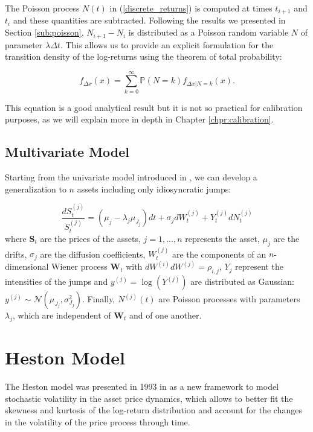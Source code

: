 The Poisson process $N(t)$ in (\ref{discrete_returns}) is computed at times $t_{i+1}$ and $t_i$ and these quantities are subtracted. Following the results we presented in Section \ref{sub:poisson}, $N_{i+1} - N_i$ is distributed as a Poisson random variable $N$ of parameter $\lambda \Delta t$.
This allows us to provide an explicit formulation for the transition density of the log-returns using the theorem of total probability:

\begin{equation}
\label{transitional}
f_{\Delta x} (x) = \sum_{k=0}^{\infty} \mathbb{P}(N = k) f_{\Delta x | N = k}(x) .
\end{equation}

This equation is a good analytical result but it is not so practical for calibration purposes, as we will explain more in depth in Chapter \ref{chpr:calibration}.


\subsection{Multivariate Model}
Starting from the univariate model introduced in \citep{MERTON1976}, we can develop a generalization to $n$ assets including only idiosyncratic jumps:

\begin{equation}
\frac{dS_t^{(j)}}{S_t^{(j)}} = (\mu_j - \lambda_j \mu_{J_j}) dt + \sigma_j dW_t^{(j)} + Y^{(j)}_t dN^{(j)}_t
\end{equation}
\noindent
where $\mathbf{S}_t$ are the prices of the assets, $j = 1, ...  ,n$ represents the asset, $\mu_j$ are the drifts, $\sigma_j$ are the diffusion coefficients, $W^{(j)}_t$ are the components of an $n$-dimensional Wiener process $ \mathbf{W}_t$ with $dW^{(i)}dW^{(j)}=\rho_{i,j}$, $Y_j$ represent the intensities of the jumps and  $y^{(j)} = \log(Y^{(j)})$ are distributed as Gaussian: $y^{(j)}  \sim \mathcal{N}(\mu_{J_j} , \sigma_{J_j}^2)$. Finally, $N^{(j)}(t)$ are Poisson processes with parameters $\lambda_j$, which are independent of $\mathbf{W}_t$ and of one another. 

\bigskip

\section{Heston Model}
\label{sec:heston}

The Heston model was presented in 1993 in \citep{HESTON93} as a new framework to model stochastic volatility in the asset price dynamics, which allows to better fit the skewness and kurtosis of the log-return distribution and account for the changes in the volatility of the price process through time.

